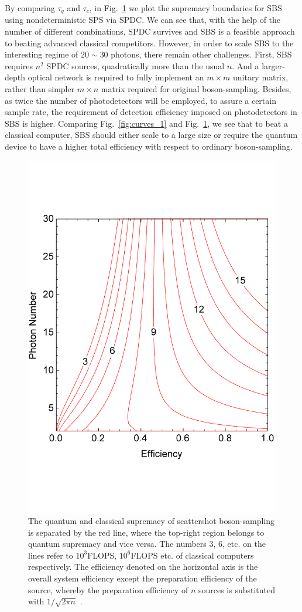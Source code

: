 \documentclass[aps,rmp,twocolumn,amsmath,amssymb,nofootinbib,superscriptaddress]{revtex4}
\begin{document}
By comparing $\tau_q$ and $\tau_c$, in Fig.~\ref{fig:curve_scattershot} we plot the supremacy boundaries for SBS using nondeterministic SPS via SPDC. We can see that, with the help of the number of different combinations, SPDC survives and SBS is a feasible approach to beating advanced classical competitors. However, in order to scale SBS to the interesting regime of $20\sim 30$ photons, there remain other challenges. First, SBS requires $n^2$ SPDC sources, quadratically more than the usual $n$. And a larger-depth optical network is required to fully implement an $m\times m$ unitary matrix, rather than simpler $m\times n$ matrix required for original boson-sampling. Besides, as twice the number of photodetectors will be employed, to assure a certain sample rate, the requirement of detection efficiency imposed on photodetectors in SBS is higher. Comparing Fig.~\ref{fig:curves_1} and Fig.~\ref{fig:curve_scattershot}, we see that to beat a classical computer, SBS should either scale to a large size or require the quantum device to have a higher total efficiency with respect to ordinary boson-sampling.

\begin{figure}[!htb]
\includegraphics[width=0.5\columnwidth]{curve_scattershot}
\caption{The quantum and classical supremacy of scattershot boson-sampling is separated by the red line, where the top-right region belongs to quantum supremacy and vice versa. The numbers 3, 6, etc. on the lines refer to $10^3$FLOPS, $10^6$FLOPS etc. of classical computers respectively. The efficiency denoted on the horizontal axis is the overall system efficiency except the preparation efficiency of the source, whereby the preparation efficiency of $n$ sources is substituted with $1/\sqrt{2\pi n}$ \cite{bib:36}.} \label{fig:curve_scattershot}
\end{figure}
\end{document}

